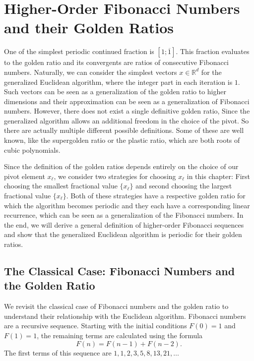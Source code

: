 \chapter{Higher-Order Fibonacci Numbers and their Golden Ratios}
\label{ch:fibonacci}

One of the simplest periodic continued fraction is $[1; \overline{1}]$.
This fraction evaluates to the golden ratio and its convergents are ratios of
consecutive Fibonacci numbers.
Naturally, we can consider the simplest vectors $x ∈ ℝ^d$ for the generalized
Euclidean algorithm, where the integer part in each iteration is $1$.
Such vectors can be seen as a generalization of the golden
ratio to higher dimensions and their approximation can be seen as a
generalization of Fibonacci numbers.
However, there does not exist a single definitive golden ratio,
Since the generalized algorithm allows an additional freedom in the choice of the pivot.
So there are actually multiple different possible definitions.
Some of these are well known, like the supergolden ratio or the plastic ratio,
which are both roots of cubic polynomials.

Since the definition of the golden ratios depends entirely on the choice of our
pivot element $x_ℓ$, we consider two strategies for choosing $x_ℓ$ in this
chapter: First choosing the smallest fractional value $\{x_ℓ\}$ and second
choosing the largest fractional value $\{x_ℓ\}$.
Both of these strategies have a respective golden ratio for which the algorithm
becomes periodic and they each have a corresponding linear recurrence, which
can be seen as a generalization of the Fibonacci numbers.
In the end, we will derive a general definition of higher-order Fibonacci
sequences and show that the generalized Euclidean algorithm is periodic for
their golden ratios.

\section{The Classical Case: Fibonacci Numbers and the Golden Ratio}

We revisit the classical case of Fibonacci numbers and the golden ratio
to understand their relationship with the Euclidean algorithm.
Fibonacci numbers are a recursive sequence.
Starting with the initial conditions $F(0) = 1$ and $F(1) = 1$,
the remaining terms are calculated using the formula
\[
  F(n) = F(n-1) + F(n-2).
\]
The first terms of this sequence are $1, 1, 2, 3, 5, 8, 13, 21, …$

